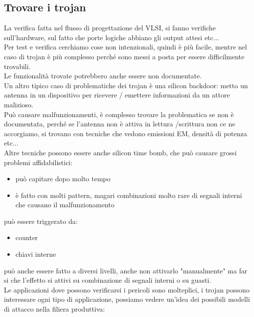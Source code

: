 \documentclass[oneside, 12pt]{extbook}
\begin{document}
\subsection{Trovare i trojan}
La verifica fatta nel flusso di progettazione del VLSI, si fanno verifiche sull'hardware, sul fatto che porte logiche abbiano gli output attesi etc...
\\Per test e verifica cerchiamo cose non intenzionali, quindi è più facile, mentre nel caso di trojan è più complesso perché sono messi a posta per essere difficilmente trovabili.
\\Le funzionalità trovate potrebbero anche essere non documentate.
\\Un altro tipico caso di problematiche dei trojan è una silicon backdoor: metto un antenna in un dispositivo per ricevere / emettere informazioni da un attore malizioso.
\\Può causare malfunzionamenti, è complesso trovare la problematica se non è documentata, perché se l'antenna non è attiva in lettura /scrittura non ce ne accorgiamo, si trovano con tecniche che vedono emissioni EM, densità di potenza etc...
\\Altre tecniche possono essere anche silicon time bomb, che può causare grossi problemi affidabilistici:
\begin{itemize}
	\item può capitare dopo molto tempo
	\item è fatto con molti pattern, magari combinazioni molto rare di segnali interni che causano il malfunzionamento
\end{itemize}
può essere triggerato da:
\begin{itemize}
	\item counter
	\item chiavi interne
\end{itemize}
può anche essere fatto a diversi livelli, anche non attivarlo "manualmente" ma far si che l'effetto si attivi su combinazione di segnali interni o su guasti.
\\Le applicazioni dove possono verificarsi i pericoli sono molteplici, i trojan possono interessare ogni tipo di applicazione, possiamo vedere un'idea dei possibili modelli di attacco nella filiera produttiva:\\\\
\end{document}
